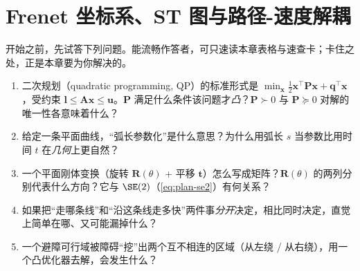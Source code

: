 \chapter{Frenet 坐标系、ST 图与路径-速度解耦}
\label{ch:frenet-st}


\begin{practice}[前置自测]
开始之前，先试答下列问题。能流畅作答者，可只速读本章表格与速查卡；卡住之处，正是本章要为你解决的。
\begin{enumerate}
  \item 二次规划（quadratic programming, QP）的标准形式是 $\min_{\mathbf{x}}\tfrac12\mathbf{x}^\top\mathbf{P}\mathbf{x}+\mathbf{q}^\top\mathbf{x}$，受约束 $\mathbf{l}\le\mathbf{A}\mathbf{x}\le\mathbf{u}$。$\mathbf{P}$ 满足什么条件该问题才\emph{凸}？$\mathbf{P}\succ0$ 与 $\mathbf{P}\succeq0$ 对解的唯一性各意味着什么？
  \item 给定一条平面曲线，“弧长参数化”是什么意思？为什么用弧长 $s$ 当参数比用时间 $t$ 在\emph{几何}上更自然？
  \item 一个平面刚体变换（旋转 $\mathbf{R}(\theta)$ + 平移 $\mathbf{t}$）怎么写成矩阵？$\mathbf{R}(\theta)$ 的两列分别代表什么方向？它与 $\SE(2)$（\cref{eq:plan-se2}）有何关系？
  \item 如果把“走哪条线”和“沿这条线走多快”两件事\emph{分开}决定，相比同时决定，直觉上简单在哪、又可能漏掉什么？
  \item 一个避障可行域被障碍“挖”出两个互不相连的区域（从左绕 / 从右绕），用一个凸优化器去解，会发生什么？
\end{enumerate}
\end{practice}

